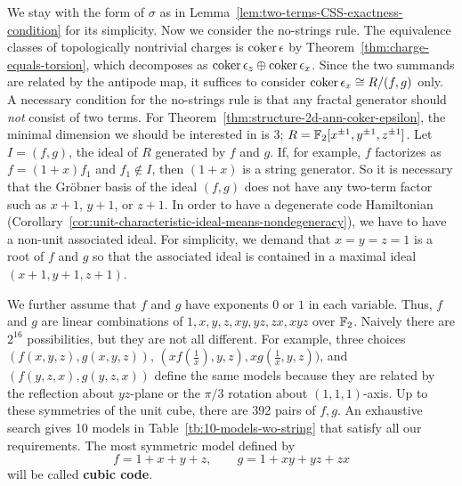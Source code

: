 We stay with the form of $\sigma$ as in
Lemma~\ref{lem:two-terms-CSS-exactness-condition}
for its simplicity.
Now we consider the no-strings rule.
The equivalence classes of topologically nontrivial charges
is $\mathop{\mathrm{coker}}\nolimits \epsilon$ by Theorem~\ref{thm:charge-equals-torsion},
which decomposes as $\mathop{\mathrm{coker}}\nolimits \epsilon_z \oplus \mathop{\mathrm{coker}}\nolimits \epsilon_x$.
Since the two summands are related by the antipode map,
it suffices to consider $\mathop{\mathrm{coker}}\nolimits \epsilon_x \cong R/(f,g)$ only.
A necessary condition for the no-strings rule is that
any fractal generator should \emph{not} consist of two terms.
For Theorem~\ref{thm:structure-2d-ann-coker-epsilon},
the minimal dimension we should be interested in is 3;
$ R = \mathbb{F}_2[x^{\pm 1},y^{\pm 1},z^{\pm 1}]$.
Let $I = (f,g)$, the ideal of $R$ generated by $f$ and $g$.
If, for example, $f$ factorizes as $f=(1+x)f_1$ and $f_1 \notin I$,
then $(1+x)$ is a string generator.
So it is necessary that the Gr\"obner basis of the ideal $(f,g)$ does not have
any two-term factor such as $x+1$, $y+1$, or $z+1$.
In order to have a degenerate code Hamiltonian 
(Corollary~\ref{cor:unit-characteristic-ideal-means-nondegeneracy}),
we have to have a non-unit associated ideal.
For simplicity, we demand that $x=y=z=1$ is a root of $f$ and $g$
so that the associated ideal is contained in a maximal ideal $(x+1,y+1,z+1)$.

We further assume that $f$ and $g$ have exponents $0$ or $1$ in each variable.
Thus, $f$ and $g$ are linear combinations of $1,x,y,z,xy,yz,zx,xyz$ over $\mathbb{F}_2$.
Naively there are $2^{16}$ possibilities, but they are not all different.
For example, three choices $(f(x,y,z),g(x,y,z))$, $(x f(\frac{1}{x}),y,z), x g(\frac{1}{x},y,z))$,
and $(f(y,z,x),g(y,z,x))$ define the same models 
because they are related by the reflection about $yz$-plane
or the $\pi/3$ rotation about $(1,1,1)$-axis.
Up to these symmetries of the unit cube, there are 392 pairs of $f,g$.
An exhaustive search gives
10 models in Table~\ref{tb:10-models-wo-string} that satisfy all our requirements.
The most symmetric model defined by
\[
f = 1+ x + y + z, \quad \quad g = 1+xy+yz+zx
\]
will be called {\bf cubic code}.


